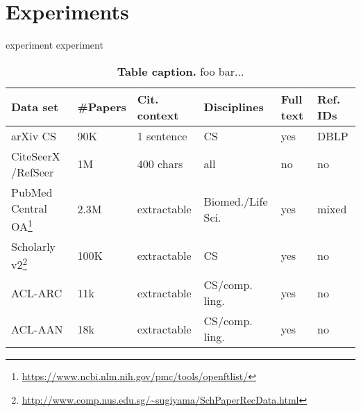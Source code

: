 \chapter{Experiments}\label{chap:experiments}
experiment experiment

\begin{table}[ht]
\begin{center}
    \begin{tabular}{llllll}
    \toprule
    Data set & \#Papers & Cit. context & Disciplines & Full text & Ref. IDs \\
    \midrule
    arXiv CS    &  90K & 1 sentence & CS & yes & DBLP \\ %
    CiteSeerX /RefSeer  &  1M & 400 chars & all & no & no \\ %
    PubMed Central OA\footnote{\url{https://www.ncbi.nlm.nih.gov/pmc/tools/openftlist/}} & 2.3M & extractable & Biomed./Life Sci. & yes & mixed \\
    Scholarly v2\footnote{\url{http://www.comp.nus.edu.sg/~sugiyama/SchPaperRecData.html}}  & 100K & extractable & CS & yes & no \\
    ACL-ARC  & 11k & extractable & CS/comp. ling. & yes & no \\ %
    ACL-AAN  & 18k & extractable & CS/comp. ling. & yes & no  \\ %
    \bottomrule
    \end{tabular}
\end{center}
    \caption[Table caption]{\textbf{Table caption.} foo bar...\\}
    \label{tab:accuracy}
\end{table}

